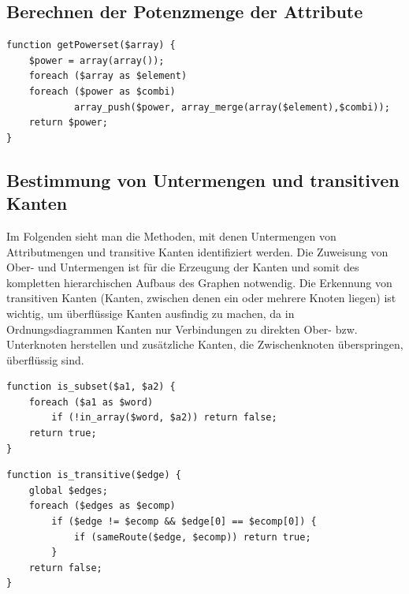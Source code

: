 \documentclass[pagesize,paper=A4,DIV=calc,fontsize=12pt,draft=false]{scrreprt}
\begin{document}
\subsection{Berechnen der Potenzmenge der Attribute}


\lstset{
language=PHP
}

\begin{lstlisting}[caption={Funktion zum Berechnen der Potenzmenge der Attribute, mit der die Graphstruktur aufgebaut wird.}]
function getPowerset($array) {
    $power = array(array());
    foreach ($array as $element)
    foreach ($power as $combi)
            array_push($power, array_merge(array($element),$combi));
    return $power;
}
\end{lstlisting}

\subsection{Bestimmung von Untermengen und transitiven Kanten}

Im Folgenden sieht man die Methoden, mit denen Untermengen von Attributmengen und transitive Kanten identifiziert werden. Die Zuweisung von Ober- und Untermengen ist für die Erzeugung der Kanten und somit des kompletten hierarchischen Aufbaus des Graphen notwendig. Die Erkennung von transitiven Kanten (Kanten, zwischen denen ein oder mehrere Knoten liegen) ist wichtig, um überflüssige Kanten ausfindig zu machen, da in Ordnungsdiagrammen Kanten nur Verbindungen zu direkten Ober- bzw. Unterknoten herstellen und zusätzliche Kanten, die Zwischenknoten überspringen, überflüssig sind.

\lstset{
language=PHP
}

\begin{lstlisting}[caption={Überprüfung, ob \texttt{\$a1} Untermenge von \texttt{\$a2} ist}]
function is_subset($a1, $a2) {
    foreach ($a1 as $word) 
        if (!in_array($word, $a2)) return false;
    return true;
}
\end{lstlisting}

\lstset{
language=PHP
}

\begin{lstlisting}[caption={Überprüfung, ob eine Kante überflüssig ist. 
Wenn der Ausgangsknoten beider Kanten gleich ist, wird überprüft, ob ein Alternativpfad existiert.}]
function is_transitive($edge) {
    global $edges;
    foreach ($edges as $ecomp) 
        if ($edge != $ecomp && $edge[0] == $ecomp[0]) { 
            if (sameRoute($edge, $ecomp)) return true;
        }
    return false;
}
\end{lstlisting}
\end{document}
